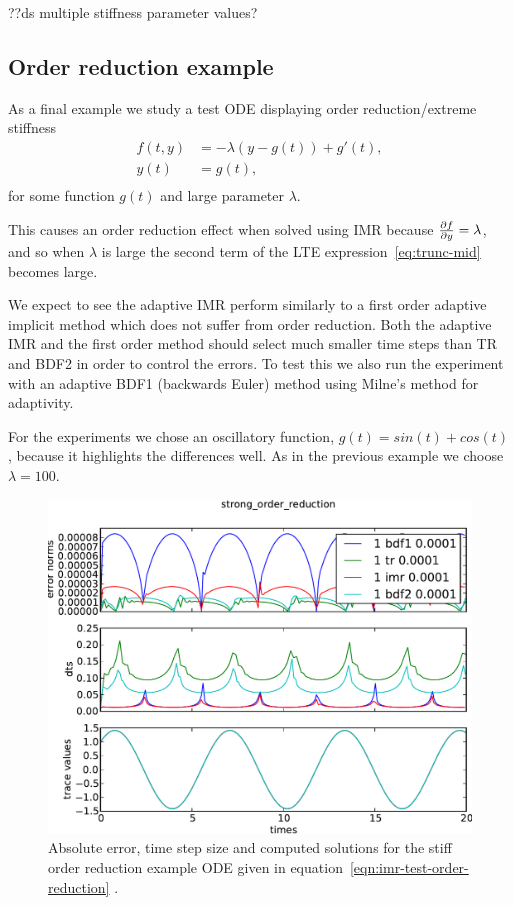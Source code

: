 ??ds multiple stiffness parameter values?


\subsection{Order reduction example}
\label{sec:order-reduct-example}

As a final example we study a test ODE displaying order reduction/extreme stiffness\cite[pg. 156]{Atkinson2009}
\begin{equation}
  \label{eqn:imr-test-order-reduction}
  \begin{aligned}
    f(t, y) &= -\lambda (y - g(t)) + g'(t), \\
    y(t) &= g(t), \\
  \end{aligned}
\end{equation}
for some function $g(t)$ and large parameter $\lambda$.

This causes an order reduction effect when solved using IMR because $\frac{\partial f}{\partial y} = \lambda$, and so when $\lambda$ is large the second term of the LTE expression~\eqref{eq:trunc-mid} becomes large.

We expect to see the adaptive IMR perform similarly to a first order adaptive implicit method which does not suffer from order reduction.
Both the adaptive IMR and the first order method should select much smaller time steps than TR and BDF2 in order to control the errors.
To test this we also run the experiment with an adaptive BDF1 (backwards Euler) method using Milne's method for adaptivity.

For the experiments we chose an oscillatory function, $g(t) = sin(t) + cos(t)$, because it highlights the differences well.
As in the previous example we choose $\lambda = 100$. 



\begin{figure}[h!]
  \centering  \includegraphics[width=1\textwidth]{aimr/strong_order_reduction-errornormsvs-dtsvs-tracevaluesvstimes}
  \caption{Absolute error, time step size and computed solutions for the stiff order reduction example ODE given in equation~\eqref{eqn:imr-test-order-reduction}
.}
  \label{fig:imr-order-reduction-example}
\end{figure}


